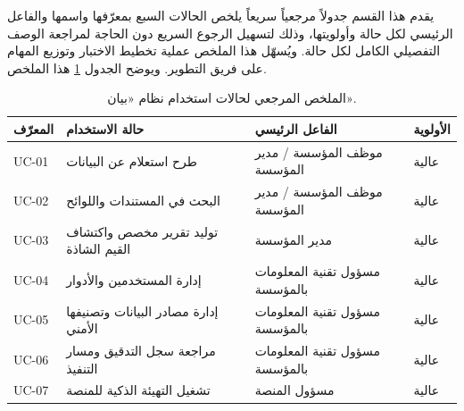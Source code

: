 يقدم هذا القسم جدولاً مرجعياً سريعاً يلخص الحالات السبع بمعرّفها واسمها والفاعل الرئيسي لكل حالة وأولويتها، وذلك لتسهيل الرجوع السريع دون الحاجة لمراجعة الوصف التفصيلي الكامل لكل حالة. ويُسهّل هذا الملخص عملية تخطيط الاختبار وتوزيع المهام على فريق التطوير. ويوضح الجدول \ref{tab:use-case-summary} هذا الملخص.

\begin{table}[H]
\centering
\caption{الملخص المرجعي لحالات استخدام نظام «بيان».}
\label{tab:use-case-summary}
\small
\renewcommand{\arraystretch}{1.45}
\begin{tabularx}{\textwidth}{|>{\centering\arraybackslash}p{1.3cm}|>{\raggedright\arraybackslash}p{4.6cm}|>{\raggedright\arraybackslash}p{4.3cm}|>{\centering\arraybackslash}p{1.8cm}|}
\hline
\textbf{المعرّف} & \textbf{حالة الاستخدام} & \textbf{الفاعل الرئيسي} & \textbf{الأولوية} \\
\hline
UC-01 & طرح استعلام عن البيانات & موظف المؤسسة / مدير المؤسسة & عالية \\
\hline
UC-02 & البحث في المستندات واللوائح & موظف المؤسسة / مدير المؤسسة & عالية \\
\hline
UC-03 & توليد تقرير مخصص واكتشاف القيم الشاذة & مدير المؤسسة & عالية \\
\hline
UC-04 & إدارة المستخدمين والأدوار & مسؤول تقنية المعلومات بالمؤسسة & عالية \\
\hline
UC-05 & إدارة مصادر البيانات وتصنيفها الأمني & مسؤول تقنية المعلومات بالمؤسسة & عالية \\
\hline
UC-06 & مراجعة سجل التدقيق ومسار التنفيذ & مسؤول تقنية المعلومات بالمؤسسة & عالية \\
\hline
UC-07 & تشغيل التهيئة الذكية للمنصة & مسؤول المنصة & عالية \\
\hline
\end{tabularx}
\end{table}
